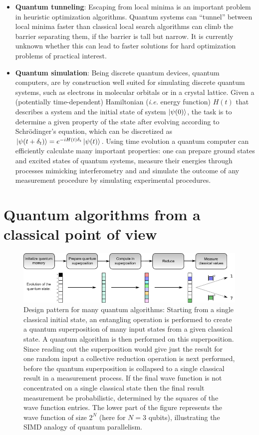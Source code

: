 \documentclass[journal]{IEEEtran}
\begin{document}
\begin{itemize}
\item   {\bf Quantum tunneling}: Escaping from local minima is an important problem in heuristic optimization algorithms. Quantum systems can ``tunnel'' between local minima faster than classical local search algorithms can climb the barrier separating them, if the barrier is tall but narrow. It is currently unknown whether this can lead to faster solutions for hard optimization problems of practical interest.

\item   {\bf Quantum simulation}: Being discrete quantum devices, quantum computers, are by construction well suited for simulating discrete quantum systems, such as electrons in molecular orbitals or in a crystal lattice. Given a (potentially time-dependent) Hamiltonian ({\it i.e.} energy function) $H(t)$ that describes a system and the initial state of system $\ket{\psi(0)}$, the task is to determine a given property of the state after evolving according to Schr\"odinger's equation, which can be discretized as  $\ket{\psi(t+\delta_t)}=e^{-iH(t)\delta_t}\ket{\psi(t)}$. Using time evolution a quantum computer can efficiently  calculate many important properties: one can prepare ground states and excited states of quantum systems, measure their energies through processes mimicking interferometry and and simulate the outcome of any measurement procedure by simulating experimental procedures.


\end{itemize}

\section{Quantum algorithms from a classical point of view}
\label{sec:box3}

\begin{figure}[t]
\centering
\includegraphics[width=\textwidth]{figures/simd}
\caption{Design pattern for many quantum algorithms: Starting from a single classical initial state, an entangling operation is performed to create a quantum superposition of many input states from a given classical state.  A quantum algorithm is then performed on this superposition. Since reading out the superposition would give just the result for one random input a collective reduction operation is next performed, before the quantum superposition is collapsed to a single classical result in a measurement process. If the final wave function is not concentrated on a single classical state then the final result measurement be probabilistic, determined by the squares of the wave function entries.  The lower part of the figure represents the wave function of size $2^N$ (here for $N=3$ qubits), illustrating the SIMD analogy of quantum parallelism. }
\label{fig:simd}
\end{figure}
\end{document}
